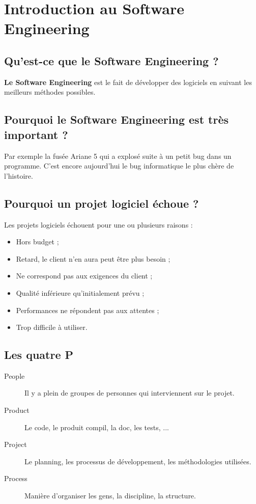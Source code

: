 \section{Introduction au Software Engineering}



\subsection{Qu'est-ce que le Software Engineering ?}
\textbf{Le Software Engineering} est le fait de développer des logiciels en suivant les meilleurs méthodes possibles.



\subsection{Pourquoi le Software Engineering est très important ?}
Par exemple la fusée Ariane 5 qui a explosé suite à un petit bug dans un programme. C'est encore aujourd'hui le bug informatique le plus chère de l'histoire.



\subsection{Pourquoi un projet logiciel échoue ?}
Les projets logiciels échouent pour une ou plusieurs raisons :
\begin{itemize}
    \item Hors budget ;
    \item Retard, le client n'en aura peut être plus besoin ;
    \item Ne correspond pas aux exigences du client ;
    \item Qualité inférieure qu'initialement prévu ;
    \item Performances ne répondent pas aux attentes ;
    \item Trop difficile à utiliser.
\end{itemize}



\subsection{Les quatre P}
\begin{description}
    \item [People] Il y a plein de groupes de personnes qui interviennent sur le projet.
    \item [Product] Le code, le produit compil, la doc, les tests, ...
    \item [Project] Le planning, les processus de développement, les méthodologies utilisées.
    \item [Process] Manière d'organiser les gens, la discipline, la structure.
\end{description}



